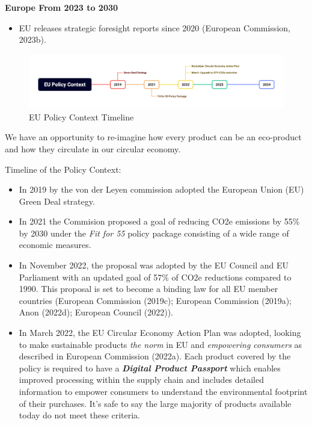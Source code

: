 \documentclass[
  letterpaper,
  DIV=11,
  numbers=noendperiod]{scrartcl}
\providecommand{\tightlist}{%
  \setlength{\itemsep}{0pt}\setlength{\parskip}{0pt}}\usepackage{longtable,booktabs,array}
\begin{document}
\textbf{Europe From 2023 to 2030}

\begin{itemize}
\tightlist
\item
  EU releases strategic foresight reports since 2020 (European
  Commission, 2023b).
\end{itemize}

\begin{figure}[H]

{\centering \includegraphics[width=1\textwidth,height=\textheight]{./images/sustainability/eu-policy-context.png}

}

\caption{EU Policy Context Timeline}

\end{figure}%

We have an opportunity to re-imagine how every product can be an
eco-product and how they circulate in our circular economy.

Timeline of the Policy Context:

\begin{itemize}
\item
  In 2019 by the von der Leyen commission adopted the European Union
  (EU) Green Deal strategy.
\item
  In 2021 the Commision proposed a goal of reducing CO2e emissions by
  55\% by 2030 under the \emph{Fit for 55} policy package consisting of
  a wide range of economic measures.
\item
  In November 2022, the proposal was adopted by the EU Council and EU
  Parliament with an updated goal of 57\% of CO2e reductions compared to
  1990. This proposal is set to become a binding law for all EU member
  countries (European Commission (2019c); European Commission (2019a);
  Anon (2022d); European Council (2022)).
\item
  In March 2022, the EU Circular Economy Action Plan was adopted,
  looking to make sustainable products \emph{the norm} in EU and
  \emph{empowering consumers} as described in European Commission
  (2022a). Each product covered by the policy is required to have a
  \textbf{\emph{Digital Product Passport}} which enables improved
  processing within the supply chain and includes detailed information
  to empower consumers to understand the environmental footprint of
  their purchases. It's safe to say the large majority of products
  available today do not meet these criteria.
\end{itemize}
\end{document}
